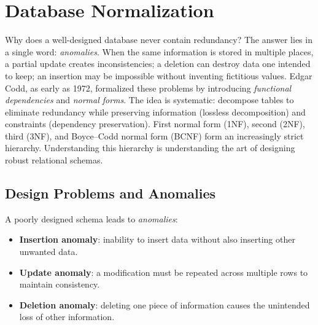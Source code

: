 \chapter{Database Normalization}
\label{ch:normalization}

Why does a well-designed database never contain redundancy? The answer lies in a single word: \emph{anomalies}. When the same information is stored in multiple places, a partial update creates inconsistencies; a deletion can destroy data one intended to keep; an insertion may be impossible without inventing fictitious values. Edgar Codd, as early as 1972, formalized these problems by introducing \emph{functional dependencies} and \emph{normal forms}. The idea is systematic: decompose tables to eliminate redundancy while preserving information (lossless decomposition) and constraints (dependency preservation). First normal form (1NF), second (2NF), third (3NF), and Boyce--Codd normal form (BCNF) form an increasingly strict hierarchy. Understanding this hierarchy is understanding the art of designing robust relational schemas.

\section{Design Problems and Anomalies}

A poorly designed schema leads to \emph{anomalies}:

\begin{definition}
\begin{itemize}
    \item \textbf{Insertion anomaly}: inability to insert data without also
          inserting other unwanted data.
    \item \textbf{Update anomaly}: a modification must be repeated across
          multiple rows to maintain consistency.
    \item \textbf{Deletion anomaly}: deleting one piece of information causes
          the unintended loss of other information.
\end{itemize}
\end{definition}

